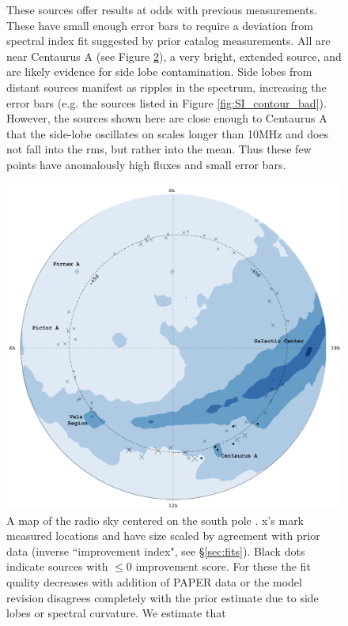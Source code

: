 \documentclass[preprint]{aastex}
\begin{document}
\begin{figure}[htbp]
\begin{center}
\end{center}
\caption{These sources offer results at odds with previous measurements. These have small enough error bars to require a deviation from spectral index fit suggested by prior catalog measurements. All are near Centaurus A (see Figure \ref{fig:error_map}), a very bright, extended source, and are likely evidence for side lobe contamination.  Side lobes from distant sources manifest as ripples in the spectrum, increasing the error bars (e.g. the sources listed in Figure \ref{fig:SI_contour_bad}). However, the sources shown here are close enough to Centaurus A that the side-lobe oscillates on scales longer than 10MHz and does not fall into the rms, but rather into the mean. Thus these few points have anomalously high fluxes and small error bars. }
\label{fig:SI_contour_new}
\end{figure}





\begin{figure}
\includegraphics[width=\textwidth]{plots/psa64_pic_strip_positions_annotated_cropped.png}
\caption{A map of the radio sky centered on the south pole \citep{deOliveiraCosta:2008p2242}.  x's mark measured locations and have size scaled by agreement with prior data (inverse ``improvement index", see \S\ref{sec:fits}). Black dots indicate sources with $\le0$ improvement score. For these the fit quality decreases with addition of PAPER data or the model revision disagrees completely with the prior estimate due to side lobes or spectral curvature.  We estimate that   \label{fig:error_map}}
\end{figure}
\end{document}
